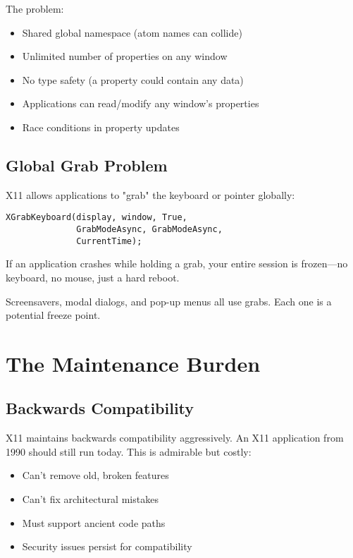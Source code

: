 The problem:
\begin{itemize}
    \item Shared global namespace (atom names can collide)
    \item Unlimited number of properties on any window
    \item No type safety (a property could contain any data)
    \item Applications can read/modify any window's properties
    \item Race conditions in property updates
\end{itemize}

\subsection{Global Grab Problem}

X11 allows applications to "grab" the keyboard or pointer globally:

\begin{lstlisting}[style=cstyle, caption=Global Grab]
XGrabKeyboard(display, window, True,
              GrabModeAsync, GrabModeAsync,
              CurrentTime);
\end{lstlisting}

If an application crashes while holding a grab, your entire session is frozen—no keyboard, no mouse, just a hard reboot.

Screensavers, modal dialogs, and pop-up menus all use grabs. Each one is a potential freeze point.

\section{The Maintenance Burden}

\subsection{Backwards Compatibility}

X11 maintains backwards compatibility aggressively. An X11 application from 1990 should still run today. This is admirable but costly:

\begin{itemize}
    \item Can't remove old, broken features
    \item Can't fix architectural mistakes
    \item Must support ancient code paths
    \item Security issues persist for compatibility
\end{itemize}

